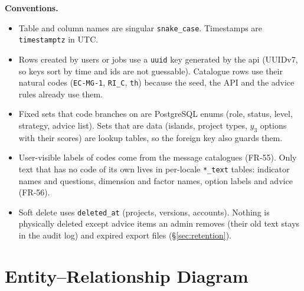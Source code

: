 \documentclass[11pt,a4paper]{article}
\newcommand{\tb}[1]{\texttt{#1}}
\begin{document}
\noindent\textbf{Conventions.}
\begin{itemize}
\item Table and column names are singular \tb{snake\_case}. Timestamps are \tb{timestamptz} in UTC.
\item Rows created by users or jobs use a \tb{uuid} key generated by the api (UUIDv7, so keys sort by time and ids are not guessable). Catalogue rows use their natural codes (\tb{EC-MG-1}, \tb{RI\_C}, \tb{th}) because the seed, the API and the advice rules already use them.
\item Fixed sets that code branches on are PostgreSQL enums (role, status, level, strategy, advice list). Sets that are data (islands, project types, $y_3$ options with their scores) are lookup tables, so the foreign key also guards them.
\item User-visible labels of codes come from the message catalogues (FR-55). Only text that has no code of its own lives in per-locale \tb{*\_text} tables: indicator names and questions, dimension and factor names, option labels and advice (FR-56).
\item Soft delete uses \tb{deleted\_at} (projects, versions, accounts). Nothing is physically deleted except advice items an admin removes (their old text stays in the audit log) and expired export files (\S\ref{sec:retention}).
\end{itemize}

\needspace{0.5\textheight}\section{Entity–Relationship Diagram}
\end{document}
